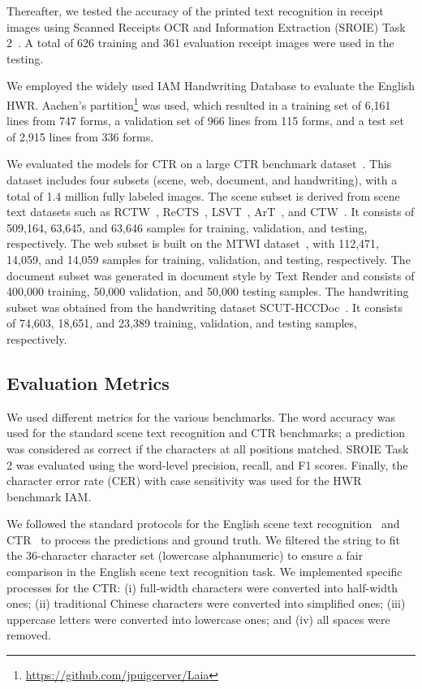 \documentclass[10pt,twocolumn,letterpaper]{article}
\begin{document}
Thereafter, we tested the accuracy of the printed text recognition in receipt images using Scanned Receipts OCR and Information Extraction (SROIE) Task 2~\cite{huang2019sroie}. 
A total of 626 training and 361 evaluation receipt images were used in the testing.

We employed the widely used IAM Handwriting Database to evaluate the English HWR.
Aachen's partition\footnote{\url{https://github.com/jpuigcerver/Laia}} was used, which resulted in a training set of 6,161 lines from 747 forms, a validation set of 966 lines from 115 forms, and a test set of 2,915 lines from 336 forms.


We evaluated the models for CTR on a large CTR benchmark dataset~\cite{yu2021btcr}.
This dataset includes four subsets (scene, web, document, and handwriting), with a total of 1.4 million fully labeled images.
The scene subset is derived from scene text datasets such as RCTW~\cite{shi2017icdar2017}, ReCTS~\cite{zhang2019icdar}, LSVT~\cite{sun2019icdar}, ArT~\cite{chng2019icdar2019}, and CTW~\cite{yuan2019large}.
It consists of 509,164, 63,645, and 63,646 samples for training, validation, and testing, respectively.
The web subset is built on the MTWI dataset~\cite{he2018MTWI}, with 112,471, 14,059, and 14,059 samples for training, validation, and testing, respectively.
The document subset was generated in document style by Text Render and consists of 400,000 training, 50,000 validation, and 50,000 testing samples.
The handwriting subset was obtained from the handwriting dataset SCUT-HCCDoc~\cite{zhang2020scut}. 
It consists of 74,603, 18,651, and 23,389 training, validation, and testing samples, respectively.


\subsection{Evaluation Metrics}
We used different metrics for the various benchmarks.
The word accuracy was used for the standard scene text recognition and CTR benchmarks; a prediction was considered as correct if the characters at all positions matched. 
SROIE Task 2 was evaluated using the word-level precision, recall, and F1 scores.
Finally, the character error rate (CER) with case sensitivity was used for the HWR benchmark IAM.

We followed the standard protocols for the English scene text recognition~\cite{bautista2022parseq, baek2021TRBA} and CTR~\cite{yu2021btcr} to process the predictions and ground truth.
We filtered the string to fit the 36-character character set (lowercase alphanumeric) to ensure a fair comparison in the English scene text recognition task. 
We implemented specific processes for the CTR: (i) full-width characters were converted into half-width ones; (ii) traditional Chinese characters were converted into simplified ones; (iii) uppercase letters were converted into lowercase ones; and (iv) all spaces were removed.
\end{document}
